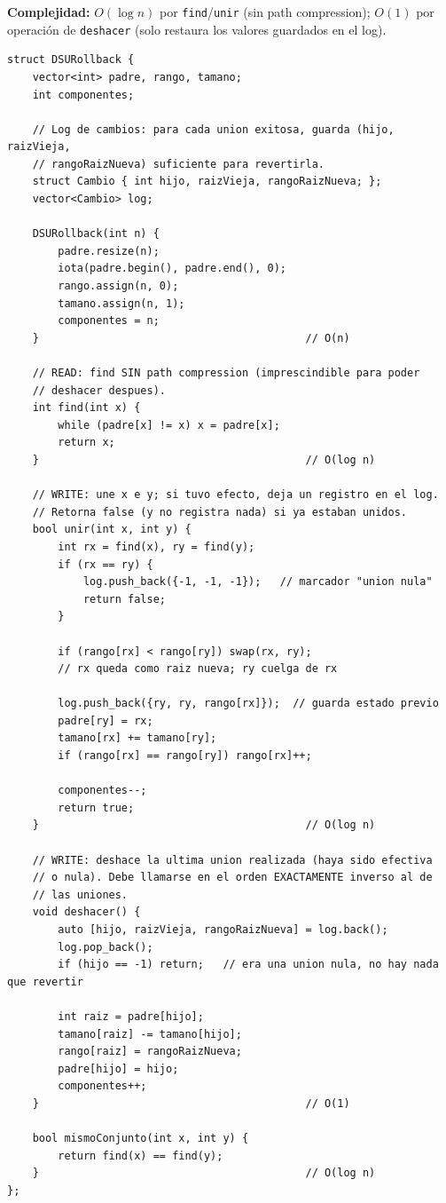 \documentclass[10pt,a4paper,twocolumn]{article}
\begin{document}
\textbf{Complejidad:} $O(\log n)$ por \texttt{find}/\texttt{unir}
(sin path compression); $O(1)$ por operación de \texttt{deshacer}
(solo restaura los valores guardados en el log).

\begin{lstlisting}[style=cpp]
struct DSURollback {
    vector<int> padre, rango, tamano;
    int componentes;

    // Log de cambios: para cada union exitosa, guarda (hijo, raizVieja,
    // rangoRaizNueva) suficiente para revertirla.
    struct Cambio { int hijo, raizVieja, rangoRaizNueva; };
    vector<Cambio> log;

    DSURollback(int n) {
        padre.resize(n);
        iota(padre.begin(), padre.end(), 0);
        rango.assign(n, 0);
        tamano.assign(n, 1);
        componentes = n;
    }                                          // O(n)

    // READ: find SIN path compression (imprescindible para poder
    // deshacer despues).
    int find(int x) {
        while (padre[x] != x) x = padre[x];
        return x;
    }                                          // O(log n)

    // WRITE: une x e y; si tuvo efecto, deja un registro en el log.
    // Retorna false (y no registra nada) si ya estaban unidos.
    bool unir(int x, int y) {
        int rx = find(x), ry = find(y);
        if (rx == ry) {
            log.push_back({-1, -1, -1});   // marcador "union nula"
            return false;
        }

        if (rango[rx] < rango[ry]) swap(rx, ry);
        // rx queda como raiz nueva; ry cuelga de rx

        log.push_back({ry, ry, rango[rx]});  // guarda estado previo
        padre[ry] = rx;
        tamano[rx] += tamano[ry];
        if (rango[rx] == rango[ry]) rango[rx]++;

        componentes--;
        return true;
    }                                          // O(log n)

    // WRITE: deshace la ultima union realizada (haya sido efectiva
    // o nula). Debe llamarse en el orden EXACTAMENTE inverso al de
    // las uniones.
    void deshacer() {
        auto [hijo, raizVieja, rangoRaizNueva] = log.back();
        log.pop_back();
        if (hijo == -1) return;   // era una union nula, no hay nada que revertir

        int raiz = padre[hijo];
        tamano[raiz] -= tamano[hijo];
        rango[raiz] = rangoRaizNueva;
        padre[hijo] = hijo;
        componentes++;
    }                                          // O(1)

    bool mismoConjunto(int x, int y) {
        return find(x) == find(y);
    }                                          // O(log n)
};
\end{lstlisting}
\end{document}
